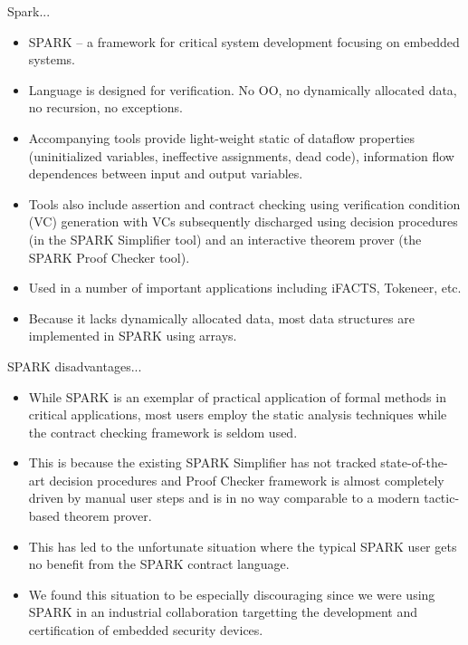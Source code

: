 Spark...
\begin{itemize}
\item SPARK -- a framework for critical system development focusing on
  embedded systems.
\item Language is designed for verification.  No OO, no dynamically
  allocated data, no recursion, no exceptions.
\item Accompanying tools provide light-weight static of dataflow
  properties (uninitialized variables, ineffective assignments, dead
  code), information flow dependences between input and output
  variables.
\item Tools also include assertion and contract checking using
  verification condition (VC) generation with VCs subsequently
  discharged using decision procedures (in the SPARK Simplifier tool)
  and an interactive theorem prover (the SPARK Proof Checker tool).
\item Used in a number of important applications including iFACTS,
  Tokeneer, etc.
\item Because it lacks dynamically allocated data, most data structures are
  implemented in SPARK using arrays.
\end{itemize}

SPARK disadvantages...
\begin{itemize}
\item While SPARK is an exemplar of practical application of formal methods
  in critical applications, most users employ the static analysis
  techniques while the contract checking framework is seldom used.
\item This is because the existing SPARK Simplifier has not tracked
  state-of-the-art decision procedures and Proof Checker framework is
  almost completely driven by manual user steps and is in no way
  comparable to a modern tactic-based theorem prover.
\item This has led to the unfortunate situation where the typical
  SPARK user gets no benefit from the SPARK contract language.
\item We found this situation to be especially discouraging since we
  were using SPARK in an industrial collaboration targetting the
  development and certification of embedded security devices.
\end{itemize}

